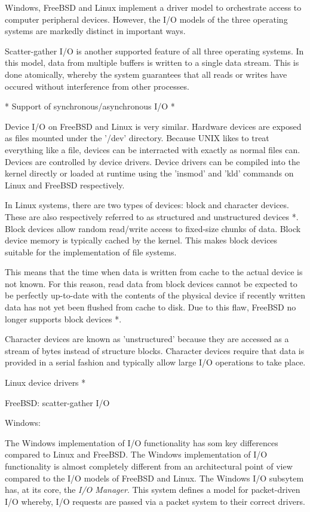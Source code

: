 \documentclass[onecolumn,10pt]{IEEETran}
\begin{document}
Windows, FreeBSD and Linux implement a driver model to orchestrate access to computer peripheral devices.  However, the I/O models of the three operating systems are markedly distinct in important ways.

	Scatter-gather I/O is another supported feature of all three operating systems.  In this model, data from multiple buffers is written to a single data stream.  This is done atomically, whereby the system guarantees that all reads or writes have occured without interference from other processes. 

* Support of synchronous/asynchronous I/O *

Device I/O on FreeBSD and Linux is very similar.  Hardware devices are exposed as files mounted under the '/dev' directory.  Because UNIX likes to treat everything like a file, devices can be interracted with exactly as normal files can.  Devices are controlled by device drivers.  Device drivers can be compiled into the kernel directly or loaded at runtime using the 'insmod' and 'kld' commands on Linux and FreeBSD respectively.

In Linux systems, there are two types of devices: block and character devices.  These are also respectively referred to as structured and unstructured devices *.  Block devices allow random read/write access to fixed-size chunks of data.  Block device memory is typically cached by the kernel.  This makes block devices suitable for the implementation of file systems.

  This means that the time when data is written from cache to the actual device is not known.  For this reason, read data from block devices cannot be expected to be perfectly up-to-date with the contents of the physical device if recently written data has not yet been flushed from cache to disk.  Due to this flaw, FreeBSD no longer supports block devices *.

  Character devices are known as 'unstructured' because they are accessed as a stream of bytes instead of structure blocks.
  Character devices require that data is provided in a serial fashion and typically allow large I/O operations to take place.


	Linux device drivers *

	
FreeBSD: scatter-gather I/O 

Windows:

  The Windows implementation of I/O functionality has som key differences compared to Linux and FreeBSD.
  The Windows implementation of I/O functionality is almost completely different from an architectural point of view compared to the I/O models of FreeBSD and Linux. The Windows I/O subsytem has, at its core, the \textit{I/O Manager}.  This system defines a model for packet-driven I/O whereby, I/O requests are passed via a packet system to their correct drivers.
  
\end{document}
